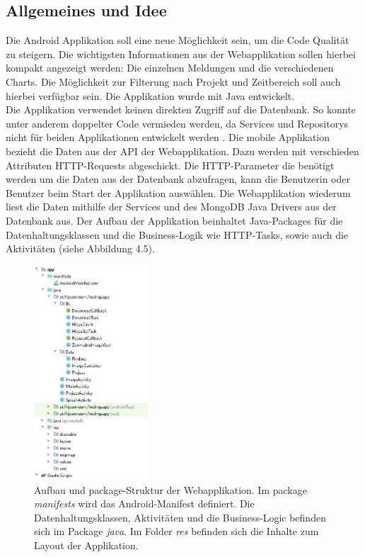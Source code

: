 \subsection{Allgemeines und Idee}
Die Android Applikation soll eine neue Möglichkeit sein, um die Code Qualität zu steigern. Die wichtigsten Informationen aus der Webapplikation sollen hierbei kompakt angezeigt werden: Die einzelnen Meldungen und die verschiedenen Charts. Die Möglichkeit zur Filterung nach Projekt und Zeitbereich soll auch hierbei verfügbar sein. Die Applikation wurde mit Java entwickelt. \\ Die Applikation verwendet keinen direkten Zugriff auf die Datenbank. So konnte unter anderem doppelter Code vermieden werden, da Services und Repositorys nicht für beiden Applikationen entwickelt werden . Die mobile Applikation bezieht die Daten aus der API der Webapplikation. Dazu werden mit verschieden Attributen HTTP-Requests abgeschickt. Die HTTP-Parameter die benötigt werden um die Daten aus der Datenbank abzufragen, kann die Benutzerin oder Benutzer beim Start der Applikation auswählen. Die Webapplikation wiederum liest die Daten mithilfe der Services und des MongoDB Java Drivers aus der Datenbank aus. Der Aufbau der Applikation beinhaltet Java-Packages für die Datenhaltungsklassen und die Business-Logik wie HTTP-Tasks, sowie auch die Aktivitäten (siehe Abbildung 4.5).

\begin{figure}[tp]
  \centering
  \includegraphics[height=8cm]{images/androidPackages.PNG}
 \caption[Aufbau und package-Struktur der Webapplikation]{Aufbau und package-Struktur der Webapplikation. Im package \textit{manifests} wird das Android-Manifest definiert. Die Datenhaltungsklassen, Aktivitäten und die Business-Logic befinden sich im Package \textit{java}. Im Folder \textit{res} befinden sich die Inhalte zum Layout der Applikation.}
  \label{fig:popup}
\end{figure}


